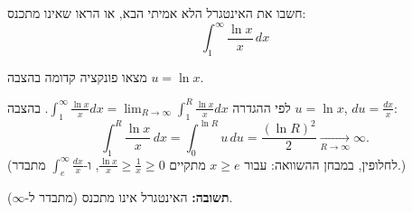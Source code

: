 
\begin{question}
חשבו את האינטגרל הלא אמיתי הבא, או הראו שאינו מתכנס:
\[ \int_1^\infty \frac{\ln x}{x}\,dx \]
\end{question}

\begin{hint}
מצאו פונקציה קדומה בהצבה $u = \ln x$.
\end{hint}

\begin{solution}
לפי ההגדרה $\int_1^\infty\frac{\ln x}{x}dx = \lim_{R\to\infty}\int_1^R\frac{\ln x}{x}dx$. בהצבה $u = \ln x$, $du = \frac{dx}{x}$:
\[ \int_1^R\frac{\ln x}{x}\,dx = \int_0^{\ln R}u\,du = \frac{(\ln R)^2}{2} \xrightarrow[R\to\infty]{} \infty. \]
(לחלופין, במבחן ההשוואה: עבור $x \ge e$ מתקיים $\frac{\ln x}{x} \ge \frac1x \ge 0$, ו-$\int_e^\infty\frac{dx}x$ מתבדר.)

\textbf{תשובה:} האינטגרל אינו מתכנס (מתבדר ל-$\infty$).
\end{solution}
